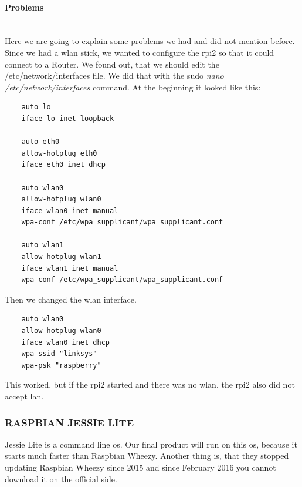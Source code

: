 \paragraph{Problems} \mbox{}\\
Here we are going to explain some problems we had and did not mention before.\newline
Since we had a \gls{wlan} stick, we wanted to configure the \gls{rpi2} so that it could connect to a Router. We found out, that we should edit the /etc/network/interfaces file. We did that with the sudo \textit{nano /etc/network/interfaces} command.\newline
At the beginning it looked like this:
\begin{verbatim}
	auto lo
	iface lo inet loopback

	auto eth0
	allow-hotplug eth0
	iface eth0 inet dhcp

	auto wlan0
	allow-hotplug wlan0
	iface wlan0 inet manual
	wpa-conf /etc/wpa_supplicant/wpa_supplicant.conf

	auto wlan1
	allow-hotplug wlan1
	iface wlan1 inet manual
	wpa-conf /etc/wpa_supplicant/wpa_supplicant.conf
\end{verbatim}
Then we changed the \gls{wlan} interface.
\begin{verbatim}
	auto wlan0
	allow-hotplug wlan0
	iface wlan0 inet dhcp
	wpa-ssid "linksys"
	wpa-psk "raspberry"
\end{verbatim}
This worked, but  if the \gls{rpi2} started and there was no \gls{wlan}, the \gls{rpi2} also did not accept \gls{lan}.
\newpage
\subsubsection{RASPBIAN JESSIE LITE}
Jessie Lite is a command line \gls{os}. Our final product will run on this \gls{os}, because it starts much faster than Raspbian Wheezy. Another thing is, that they stopped updating Raspbian Wheezy since 2015 and since February 2016 you cannot download it on the official side.
